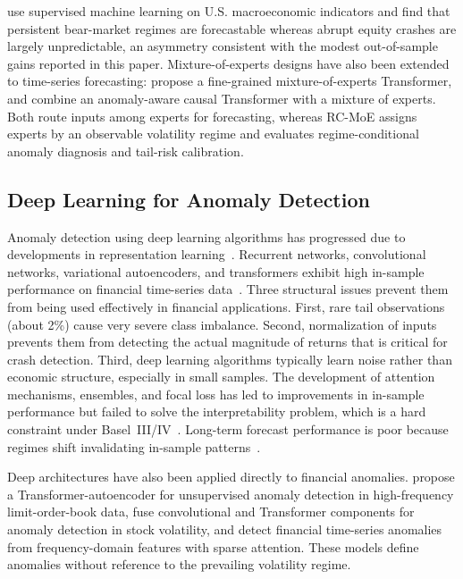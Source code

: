 \documentclass[]{interact}
\begin{document}
\citet{malladi2026regime} use supervised machine learning on U.S. macroeconomic indicators and find that persistent bear-market regimes are forecastable whereas abrupt equity crashes are largely unpredictable, an asymmetry consistent with the modest out-of-sample gains reported in this paper. Mixture-of-experts designs have also been extended to time-series forecasting: \citet{yang2026expert} propose a fine-grained mixture-of-experts Transformer, and \citet{zhang2026act} combine an anomaly-aware causal Transformer with a mixture of experts. Both route inputs among experts for forecasting, whereas RC-MoE assigns experts by an observable volatility regime and evaluates regime-conditional anomaly diagnosis and tail-risk calibration.


\subsection{Deep Learning for Anomaly Detection}

Anomaly detection using deep learning algorithms has progressed due to developments in representation learning~\citep{darban2023deep, pang2021deep}. Recurrent networks, convolutional networks, variational autoencoders, and transformers exhibit high in-sample performance on financial time-series data~\citep{su2025anoma, wu2024anoma, cao2024autom}. Three structural issues prevent them from being used effectively in financial applications. First, rare tail observations (about 2\%) cause very severe class imbalance. Second, normalization of inputs prevents them from detecting the actual magnitude of returns that is critical for crash detection. Third, deep learning algorithms typically learn noise rather than economic structure, especially in small samples. The development of attention mechanisms, ensembles, and focal loss has led to improvements in in-sample performance but failed to solve the interpretability problem, which is a hard constraint under Basel~III/IV~\citep{arrieta2020explainable}. Long-term forecast performance is poor because regimes shift invalidating in-sample patterns~\citep{liu2024times}.

Deep architectures have also been applied directly to financial anomalies. \citet{poutre2024deep} propose a Transformer-autoencoder for unsupervised anomaly detection in high-frequency limit-order-book data, \citet{mu2026fctstock} fuse convolutional and Transformer components for anomaly detection in stock volatility, and \citet{cao2026interpretable} detect financial time-series anomalies from frequency-domain features with sparse attention. These models define anomalies without reference to the prevailing volatility regime.
\end{document}

